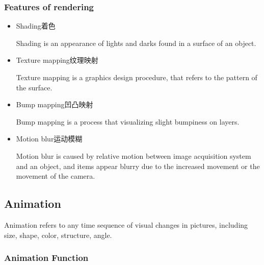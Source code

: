 \documentclass[UTF8]{ctexart}
\begin{document}
\subsubsection{Features of rendering}
\begin{itemize}
    \item Shading着色
    
    Shading is an appearance of lights and darks found in a surface of an object.
    \item Texture mapping纹理映射
    
    Texture mapping is a graphics design procedure, that refers to the pattern of the surface.
    \item Bump mapping凹凸映射
    
    Bump mapping is a process that visualizing slight bumpiness on layers.
    \item Motion blur运动模糊
    
    Motion blur is caused by relative motion between image acquisition system and an object, and items appear blurry due to the increased movement or the movement of the camera.
\end{itemize}

\subsection{Animation}
Animation refers to any time sequence of visual changes in pictures, including size, shape, color, structure, angle.

\subsubsection{Animation Function}
\end{document}
